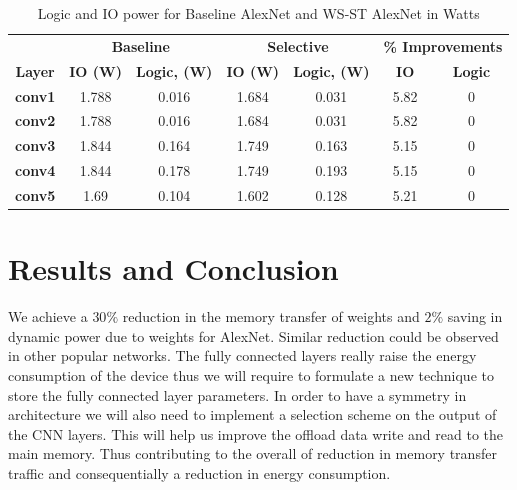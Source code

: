\documentclass[conference]{IEEEtran}
\begin{document}
\begin{table}[!ht]
\centering
\caption{Logic and IO power for Baseline AlexNet and WS-ST AlexNet in Watts }
\label{LogIO}
\begin{tabular}{ccccccc}
\hline
               & \multicolumn{2}{c}{\textbf{Baseline}} & \multicolumn{2}{c}{\textbf{Selective}} & \multicolumn{2}{c}{\textbf{\% Improvements}} \\ 
\textbf{Layer} & \textbf{IO (W)}               &\textbf{ Logic, (W)}             &\textbf{IO (W)}                  & \textbf{ Logic, (W)}            & \textbf{IO }                                   & \textbf{ Logic}  \\ \hline
\textbf{conv1} & 1.788             & 0.016             & 1.684              & 0.031             & 5.82                 & 0                     \\
\textbf{conv2} & 1.788             & 0.016             & 1.684              & 0.031             & 5.82                 & 0                     \\
\textbf{conv3} & 1.844             & 0.164             & 1.749              & 0.163             & 5.15                 & 0                     \\
\textbf{conv4} & 1.844             & 0.178             & 1.749              & 0.193             & 5.15                 & 0                     \\
\textbf{conv5} & 1.69              & 0.104             & 1.602              & 0.128             & 5.21                 & 0                     \\ \hline
\end{tabular}
\end{table}

\section{Results and Conclusion}
We achieve a $30\%$ reduction in the memory transfer of weights and $ 2\%$ saving in dynamic power due to weights for AlexNet. Similar reduction could be observed in other popular networks. The fully connected layers really raise the energy consumption of the device thus we will require to formulate a new technique to store the fully connected layer parameters.
In order to have a symmetry in architecture we will also need to implement a selection scheme on the output of the CNN layers. This will help us improve the offload  data write and read to the main memory. Thus contributing to the overall of reduction in memory transfer traffic and consequentially a reduction in energy consumption. 
\end{document}

